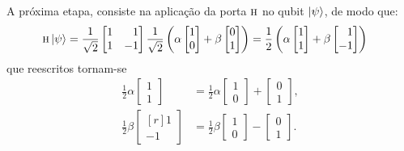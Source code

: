 A próxima etapa, consiste na aplicação da porta \(\operatorname{\textsc{h}}\) no qubit $\ket{\psi}$, de modo que:
\begin{equation}\label{eq:halfabeta}
  	\begin{split}
		\HAD \ket{\psi} &= \frac{1}{\sqrt{2}} \begin{bmatrix*}[r]
		1 & 1 \\
		1 & -1
		\end{bmatrix*} \frac{1}{\sqrt{2}}\left(\alpha \begin{bmatrix}
		1 \\
		0 
		\end{bmatrix} + \beta \begin{bmatrix}
		0 \\
		1
		\end{bmatrix} \right) = \frac{1}{2} \left(\alpha \begin{bmatrix}
		1 \\
		1 
		\end{bmatrix} + \beta \begin{bmatrix*}[r]
		1 \\
		-1
		\end{bmatrix*} \right)
  	\end{split}
\end{equation}
que reescritos tornam-se
\begin{equation} \label{eq:alfabetasoma}
  \begin{split}
\frac{1}{2} \alpha \begin{bmatrix}
1 \\
1 
\end{bmatrix} &= \frac{1}{2} \alpha \begin{bmatrix}
1 \\
0 
\end{bmatrix} + \begin{bmatrix}
0 \\
1 
\end{bmatrix}, \\
\frac{1}{2} \beta \begin{bmatrix*}[r]
1 \\
-1
\end{bmatrix*} &= \frac{1}{2} \beta \begin{bmatrix}
1 \\
0
\end{bmatrix} - \begin{bmatrix}
0 \\
1
\end{bmatrix}.
  \end{split}
\end{equation}

